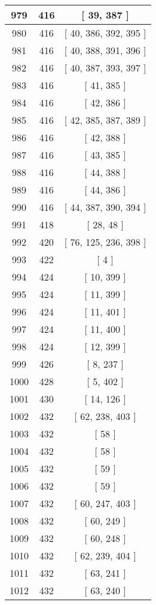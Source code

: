\begin{center}
\begin{longtable}[H]{|| c c c ||}
\hline
979 & 416 & [ 39, 387 ] \\ 
\hline
980 & 416 & [ 40, 386, 392, 395 ] \\ 
\hline
981 & 416 & [ 40, 388, 391, 396 ] \\ 
\hline
982 & 416 & [ 40, 387, 393, 397 ] \\ 
\hline
983 & 416 & [ 41, 385 ] \\ 
\hline
984 & 416 & [ 42, 386 ] \\ 
\hline
985 & 416 & [ 42, 385, 387, 389 ] \\ 
\hline
986 & 416 & [ 42, 388 ] \\ 
\hline
987 & 416 & [ 43, 385 ] \\ 
\hline
988 & 416 & [ 44, 388 ] \\ 
\hline
989 & 416 & [ 44, 386 ] \\ 
\hline
990 & 416 & [ 44, 387, 390, 394 ] \\ 
\hline
991 & 418 & [ 28, 48 ] \\ 
\hline
992 & 420 & [ 76, 125, 236, 398 ] \\ 
\hline
993 & 422 & [ 4 ] \\ 
\hline
994 & 424 & [ 10, 399 ] \\ 
\hline
995 & 424 & [ 11, 399 ] \\ 
\hline
996 & 424 & [ 11, 401 ] \\ 
\hline
997 & 424 & [ 11, 400 ] \\ 
\hline
998 & 424 & [ 12, 399 ] \\ 
\hline
999 & 426 & [ 8, 237 ] \\ 
\hline
1000 & 428 & [ 5, 402 ] \\ 
\hline
1001 & 430 & [ 14, 126 ] \\ 
\hline
1002 & 432 & [ 62, 238, 403 ] \\ 
\hline
1003 & 432 & [ 58 ] \\ 
\hline
1004 & 432 & [ 58 ] \\ 
\hline
1005 & 432 & [ 59 ] \\ 
\hline
1006 & 432 & [ 59 ] \\ 
\hline
1007 & 432 & [ 60, 247, 403 ] \\ 
\hline
1008 & 432 & [ 60, 249 ] \\ 
\hline
1009 & 432 & [ 60, 248 ] \\ 
\hline
1010 & 432 & [ 62, 239, 404 ] \\ 
\hline
1011 & 432 & [ 63, 241 ] \\ 
\hline
1012 & 432 & [ 63, 240 ] \\ 

\end{longtable}
\end{center}
